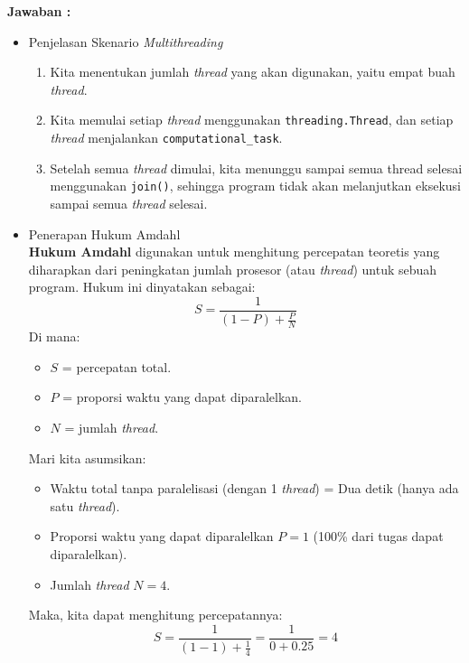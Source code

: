 \documentclass[12pt]{article}
\begin{document}
\textbf{Jawaban : }
\begin{itemize}
    \item Penjelasan Skenario \textit{Multithreading}
        \begin{enumerate}
            \item Kita menentukan jumlah \textit{thread} yang akan digunakan, yaitu empat buah \textit{thread}.
            \item Kita memulai setiap \textit{thread} menggunakan \texttt{threading.Thread}, dan setiap \textit{thread} menjalankan \texttt{computational\_task}.
            \item Setelah semua \textit{thread} dimulai, kita menunggu sampai semua thread selesai menggunakan \texttt{join()}, sehingga program tidak akan melanjutkan eksekusi sampai semua \textit{thread} selesai.
        \end{enumerate}
    \item Penerapan Hukum Amdahl \\
        \textbf{Hukum Amdahl} digunakan untuk menghitung percepatan teoretis yang diharapkan dari peningkatan jumlah prosesor (atau \textit{thread}) untuk sebuah program. Hukum ini dinyatakan sebagai:
        \begin{equation}
            S = \frac{1}{(1 - P) + \frac{P}{N}}
        \end{equation}
        Di mana:
        \begin{itemize}
            \item \( S \) = percepatan total.
            \item \( P \) = proporsi waktu yang dapat diparalelkan.
            \item \( N \) = jumlah \textit{thread}.
        \end{itemize}

        Mari kita asumsikan:
        \begin{itemize}
            \item Waktu total tanpa paralelisasi (dengan 1 \textit{thread}) = Dua detik (hanya ada satu \textit{thread}).
            \item Proporsi waktu yang dapat diparalelkan \( P = 1 \) (100\% dari tugas dapat diparalelkan).
            \item Jumlah \textit{thread} \( N = 4 \).
        \end{itemize}
        Maka, kita dapat menghitung percepatannya:
\begin{equation}
S = \frac{1}{(1 - 1) + \frac{1}{4}} = \frac{1}{0 + 0.25} = 4
\end{equation}
\end{itemize}
\end{document}
